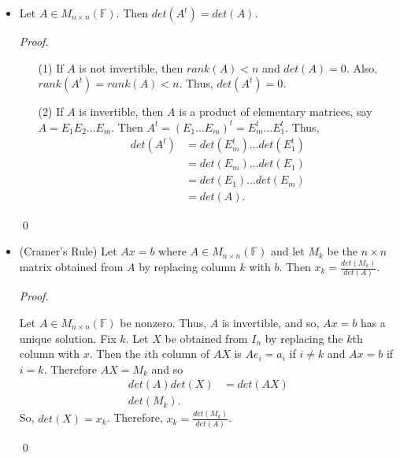 \documentclass[12pt]{article}
\newenvironment{sol}
    {\emph{Proof.}
    }
    {
    \qed
    }
\begin{document}
\begin{itemize}
\begin{sol}
\begin{itemize}
        \item[$\Longleftarrow$] If $A$ is invertible, then $A \cdot A^{-1} = I_n$. Thus, by the fact above, $1 = det(I_n) = det(A)det(A^{-1})$. So, $det(A) \neq 0$.
    \end{itemize}
    \end{sol}
    
    \item Let $A \in M_{n \times n}(\mathbb{F})$. Then $det(A^t) = det(A)$.
    
    \begin{sol}
    \begin{itemize}
        \item[(1)] If $A$ is not invertible, then $rank(A) < n$ and $det(A) = 0$. Also, $rank(A^t) = rank(A) < n$. Thus, $det(A^t) = 0$. 
        \item[(2)] If $A$ is invertible, then $A$ is a product of elementary matrices, say $A = E_1E_2 \dots E_m$. Then $A^t = (E_1 \dots E_m)^t = E_m^t \dots E_1^t$. Thus, \begin{align*}
            det(A^t) &= det(E_m^t) \dots det(E_1^t) \\
            &= det(E_m) \dots det(E_1) \\
            &= det(E_1) \dots det(E_m) \\
            &= det(A).
        \end{align*}
    \end{itemize}
    \end{sol}
    
    \item (Cramer's Rule) Let $Ax = b$ where $A \in M_{n \times n}(\mathbb{F})$ and let $M_k$ be the $n \times n$ matrix obtained from $A$ by replacing column $k$ with $b$. Then $x_k = \frac{det(M_k)}{det(A)}$.
    
    \begin{sol}
    Let $A \in M_{n \times n}(\mathbb{F})$ be nonzero. Thus, $A$ is invertible, and so, $Ax = b$ has a unique solution. Fix $k$. Let $X$ be obtained from $I_n$ by replacing the $k$th column with $x$. Then the $i$th column of $AX$ is $Ae_i = a_i$ if $i \neq k$ and $Ax = b$ if $i = k$. Therefore $AX = M_k$ and so \begin{align*}
        det(A)det(X) &= det(AX) \\ det(M_k).
    \end{align*} So, $det(X) = x_k$. Therefore, $x_k = \frac{det(M_k)}{det(A)}$.
    \end{sol}
\end{itemize}
\end{document}
